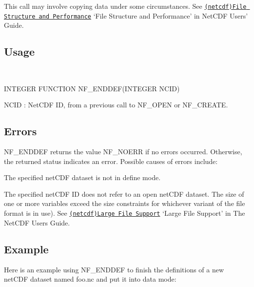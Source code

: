 This call may involve copying data under some circumstances. See \href{netcdf.html#File-Structure-and-Performance}{\tt (netcdf)File Structure and Performance} ‘\+File Structure and Performance’ in Net\+C\+DF Users’ Guide.

\subsection*{Usage }

 

I\+N\+T\+E\+G\+ER F\+U\+N\+C\+T\+I\+ON N\+F\+\_\+\+E\+N\+D\+D\+E\+F(\+I\+N\+T\+E\+G\+E\+R N\+C\+I\+D)

{\ttfamily N\+C\+ID} \+: Net\+C\+DF ID, from a previous call to N\+F\+\_\+\+O\+P\+EN or N\+F\+\_\+\+C\+R\+E\+A\+TE.

\subsection*{Errors }

N\+F\+\_\+\+E\+N\+D\+D\+EF returns the value N\+F\+\_\+\+N\+O\+E\+RR if no errors occurred. Otherwise, the returned status indicates an error. Possible causes of errors include\+:


\begin{DoxyItemize}
\item The specified net\+C\+DF dataset is not in define mode.
\item The specified net\+C\+DF ID does not refer to an open net\+C\+DF dataset. The size of one or more variables exceed the size constraints for whichever variant of the file format is in use). See \href{netcdf.html#Large-File-Support}{\tt (netcdf)Large File Support} ‘\+Large File Support’ in The Net\+C\+DF Users Guide.
\end{DoxyItemize}

\subsection*{Example }

Here is an example using N\+F\+\_\+\+E\+N\+D\+D\+EF to finish the definitions of a new net\+C\+DF dataset named foo.\+nc and put it into data mode\+:


